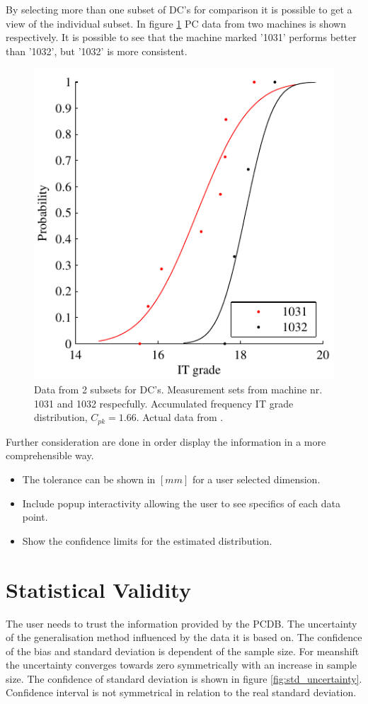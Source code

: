 \documentclass[aip,amsmath, reprint, author-year]{revtex4-1}
\begin{document}
By selecting more than one subset of DC's for comparison it is possible to get a view of the individual subset. In figure \ref{fig:acumfreqF3} PC data from two machines is shown respectively. It is possible to see that the machine marked '1031' performs better than '1032', but '1032' is more consistent.

\begin{figure}
\includegraphics{Acum_freqF3.pdf}
\caption{\label{fig:acumfreqF3} Data from 2 subsets for DC's. Measurement sets from machine nr. 1031 and 1032 respecfully. Accumulated frequency IT grade distribution, $C_{pk} =1.66$. Actual data from \cite{thornton2000use}. }
\end{figure}

Further consideration are done in order display the information in a more comprehensible way.
\begin{itemize}
\item The tolerance can be shown in $[mm]$ for a user selected dimension.
\item Include popup interactivity allowing the user to see specifics of each data point.
\item Show the confidence limits for the estimated distribution.
\end{itemize}

\section{Statistical Validity}
The user needs to trust the information provided by the PCDB. The uncertainty of the generalisation method influenced by the data it is based on. The confidence of the bias and standard deviation is dependent of the sample size. For meanshift the uncertainty converges towards zero symmetrically with an increase in sample size. The confidence of standard deviation is shown in figure \ref{fig:std_uncertainty}. Confidence interval is not symmetrical in relation to the real standard deviation.
\end{document}
